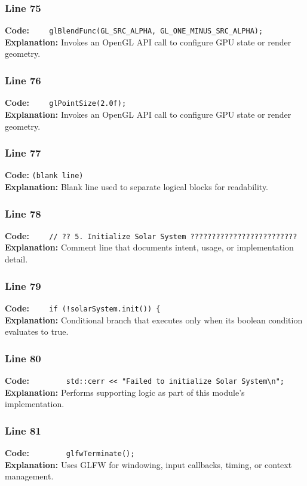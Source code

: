 \documentclass[11pt,a4paper]{article}
\begin{document}
\subsubsection*{Line 75}
\textbf{Code:} \verb|    glBlendFunc(GL_SRC_ALPHA, GL_ONE_MINUS_SRC_ALPHA);|\\
\textbf{Explanation:} Invokes an OpenGL API call to configure GPU state or render geometry.

\subsubsection*{Line 76}
\textbf{Code:} \verb|    glPointSize(2.0f);|\\
\textbf{Explanation:} Invokes an OpenGL API call to configure GPU state or render geometry.

\subsubsection*{Line 77}
\textbf{Code:} \texttt{(blank line)}\\
\textbf{Explanation:} Blank line used to separate logical blocks for readability.

\subsubsection*{Line 78}
\textbf{Code:} \verb|    // ?? 5. Initialize Solar System ?????????????????????????|\\
\textbf{Explanation:} Comment line that documents intent, usage, or implementation detail.

\subsubsection*{Line 79}
\textbf{Code:} \verb|    if (!solarSystem.init()) {|\\
\textbf{Explanation:} Conditional branch that executes only when its boolean condition evaluates to true.

\subsubsection*{Line 80}
\textbf{Code:} \verb|        std::cerr << "Failed to initialize Solar System\n";|\\
\textbf{Explanation:} Performs supporting logic as part of this module's implementation.

\subsubsection*{Line 81}
\textbf{Code:} \verb|        glfwTerminate();|\\
\textbf{Explanation:} Uses GLFW for windowing, input callbacks, timing, or context management.
\end{document}
